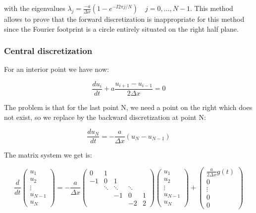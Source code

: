 with the eigenvalues $\lambda _j = \frac{-a}{\Delta x} (1 - e^{-I2\pi j /N}) \quad j = 0, \dots , N-1$. This method allows to prove that the forward discretization is inappropriate for this method since the Fourier footprint is a circle entirely situated on the right half plane. 

\subsubsection{Central discretization}
For an interior point we have now: 

\begin{equation}
\frac{du_i}{dt} + a \frac{u_{i+1} - u_{i-1}}{2\Delta x} = 0
\end{equation}

The problem is that for the last point N, we need a point on the right which does not exist, so we replace by the backward discretization at point N:

\begin{equation}
\frac{du_N}{dt} = -\frac{a}{\Delta x} (u_N - u_{N-1})
\end{equation}

The matrix system we get is: 

\begin{equation}
\frac{d}{dt} \left(\begin{array}{c}
u_1\\
u_2 \\
\vdots\\
u_{N-1}\\
u_{N}
\end{array} \right) = -\frac{a}{\Delta x}
\left(
\begin{array}{ccccc}
0 & 1  \\
-1 & 0 & 1  \\
& \ddots & \ddots & \ddots \\
& & -1 & 0 & 1 \\
& & & -2 & 2
\end{array}
\right)\left(\begin{array}{c}
u_1\\
u_2 \\
\vdots\\
u_{N-1}\\
u_{N}
\end{array} \right)
+
\left(\begin{array}{c}
\frac{a}{2\Delta x}g(t)\\
0\\
\vdots\\
0\\
0
\end{array} \right)
\end{equation}

